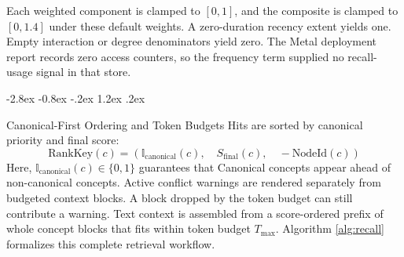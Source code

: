 \documentclass[10pt,twocolumn]{article}
\makeatletter
\renewcommand\subsection{\@startsection{subsection}{2}{\z@}%
  {-2.8ex \@plus -0.8ex \@minus -.2ex}%
  {1.2ex \@plus .2ex}%
  {\normalfont\normalsize\bfseries\raggedright}}
\makeatother
\begin{document}
Each weighted component is clamped to $[0,1]$, and the composite is clamped to $[0,1.4]$ under these default weights.
A zero-duration recency extent yields one. Empty interaction or degree denominators yield zero.
The Metal deployment report records zero access counters, so the frequency term supplied no recall-usage signal in that store.

\subsection{Canonical-First Ordering and Token Budgets}
Hits are sorted by canonical priority and final score:
\begin{equation}
\text{RankKey}(c) = (\mathbb{I}_{\text{canonical}}(c), \quad S_{\text{final}}(c), \quad -\text{NodeId}(c))
\end{equation}
Here, $\mathbb{I}_{\text{canonical}}(c) \in \{0, 1\}$ guarantees that Canonical concepts appear ahead of non-canonical concepts.
Active conflict warnings are rendered separately from budgeted context blocks. A block dropped by the token budget can still contribute a warning.
Text context is assembled from a score-ordered prefix of whole concept blocks that fits within token budget $T_{\max}$.
Algorithm \ref{alg:recall} formalizes this complete retrieval workflow.
\end{document}
